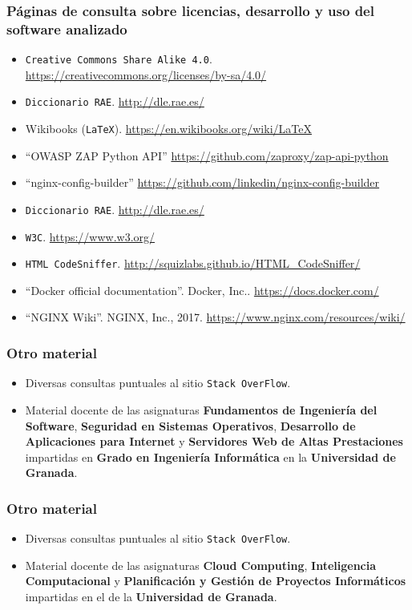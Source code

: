 
\printbibliography[heading=bibempty]

\bigskip
\subsubsection*{Páginas de consulta sobre licencias, desarrollo y uso del software analizado}
\begin{itemize}
	\item {\tt Creative Commons Share Alike 4.0}. \url{https://creativecommons.org/licenses/by-sa/4.0/}
	\item {\tt Diccionario RAE}. \url{http://dle.rae.es/}
	\item Wikibooks ({\tt LaTeX}). \url{https://en.wikibooks.org/wiki/LaTeX}
	\item ``OWASP ZAP Python API'' \url{https://github.com/zaproxy/zap-api-python}
	\item ``nginx-config-builder'' \url{https://github.com/linkedin/nginx-config-builder}
	\item {\tt Diccionario RAE}. \url{http://dle.rae.es/}
	\item {\tt W3C}. \url{https://www.w3.org/}
	\item {\tt HTML CodeSniffer}. \url{http://squizlabs.github.io/HTML_CodeSniffer/}
	\item ``Docker official documentation''. Docker, Inc.. \url{https://docs.docker.com/}
	\item ``NGINX Wiki''. NGINX, Inc., 2017. \url{https://www.nginx.com/resources/wiki/}
\end{itemize}
\bigskip
\subsubsection*{Otro material}
\begin{itemize}
	\item Diversas consultas puntuales al sitio {\tt Stack OverFlow}.
	\item Material docente de las asignaturas \textbf{Fundamentos de Ingeniería del Software}, \textbf{Seguridad en Sistemas Operativos}, \textbf{Desarrollo de Aplicaciones para Internet} y \textbf{Servidores Web de Altas Prestaciones} impartidas en \textbf{Grado en Ingeniería Informática} en la \textbf{Universidad de Granada}.
\end{itemize}

\subsubsection*{Otro material}
\begin{itemize}
	\item Diversas consultas puntuales al sitio {\tt Stack OverFlow}.
	\item Material docente de las asignaturas \textbf{Cloud Computing}, \textbf{Inteligencia Computacional} y \textbf{Planificación y Gestión de Proyectos Informáticos} impartidas en el \master de la \textbf{Universidad de Granada}.
\end{itemize}
